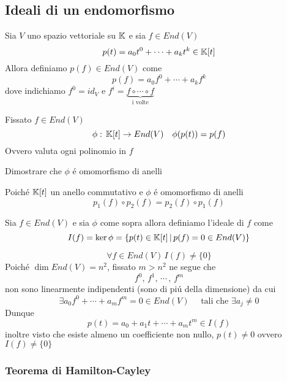 \subsection{Ideali di un endomorfismo}
\begin{defn}\bianco
Sia $V $ uno spazio vettoriale su $\mathbb{K}$ e sia $f\in End(V) $
$$ p(t)=a_0 t^0 + \cdots + a_k t^k \in \mathbb{K}[t]$$
Allora definiamo $p(f)\in End(V)$ come 
$$ p(f)=a_0 f^0 + \cdots+ a_k f^k $$
dove indichiamo $f^0=id_V $ e $f^i= \underbrace{ f \circ \cdots \circ  f}_{\text{ i volte } } $
\end{defn}
\spazio
Fissato $f\in End(V) $ 
$$ \phi: \, \mathbb{K}[t]\to End(V) \quad \phi(p(t))=p(f)$$ 
Ovvero valuta ogni polinomio in $f$ 
\begin{ex} Dimostrare che $\phi $ \'e omomorfismo di anelli 
\end{ex}
\begin{oss}\label{commu}Poich\'e $\mathbb{K}[t]$ un anello commutativo e $\phi$ \'e omomorfismo di anelli
$$ p_1(f)\circ p_2(f)=p_2(f)\circ p_1(f)$$
\end{oss}
\spazio
\begin{defn}\bianco
Sia $f\in End(V) $ e sia $\phi$ come sopra  allora definiamo l'ideale di $f$ come 
$$ I(f)=\ker \phi =\{  p(t) \in \mathbb{K}[t]\, \vert \, p(f)=0\in End(V)\}$$ 
\end{defn}
 \spazio
 \begin{lem}
$$\forall f \in End(V) \, I (f)\neq \{ 0 \} $$
\proof
Poich\'e $\dim End(V)= n^2$, fissato $m>n^2 $ ne segue che 
$$ f^0 , \, f^1, \, \cdots \, , \, f^m $$
 non sono linearmente indipendenti (sono di pi\'u della dimensione) da cui
$$ \exists a_0 f^0 +\cdots + a_m f^m = 0 \in End(V) \quad \text{ tali che } \exists a_j \neq 0 $$ 
Dunque
$$ p(t)= a_0 +a_1 t + \cdots + a_m t^m \in I(f) $$ 
inoltre visto che esiste almeno un coefficiente non nullo, $p(t)\neq 0 $ ovvero $I(f) \neq \{ 0 \}$
\endproof
\end{lem}
\spazio
\subsubsection{Teorema di Hamilton-Cayley}

